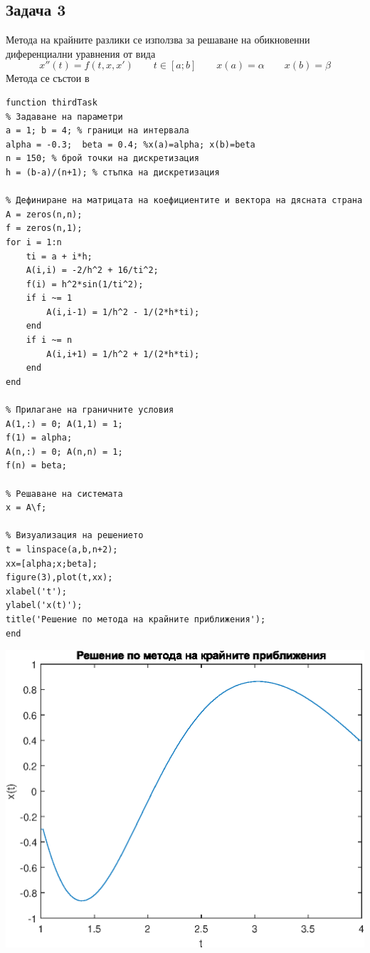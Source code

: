 \documentclass[a4paper,fleqn,12pt]{article}
\begin{document}
\newpage
\subsection{Задача 3}
Метода на крайните разлики се използва за решаване на обикновенни диференциални уравнения от вида 
\begin{equation*}
	x''(t)=f(t,x,x') \qquad t \in [a;b] \qquad x(a) = \alpha \qquad x(b) = \beta
\end{equation*}
Метода се състои в

\newpage
\begin{verbatim}
function thirdTask
% Задаване на параметри
a = 1; b = 4; % граници на интервала
alpha = -0.3;  beta = 0.4; %x(a)=alpha; x(b)=beta
n = 150; % брой точки на дискретизация
h = (b-a)/(n+1); % стъпка на дискретизация

% Дефиниране на матрицата на коефициентите и вектора на дясната страна
A = zeros(n,n);
f = zeros(n,1);
for i = 1:n
    ti = a + i*h;
    A(i,i) = -2/h^2 + 16/ti^2;
    f(i) = h^2*sin(1/ti^2);
    if i ~= 1
        A(i,i-1) = 1/h^2 - 1/(2*h*ti);
    end
    if i ~= n
        A(i,i+1) = 1/h^2 + 1/(2*h*ti);
    end
end

% Прилагане на граничните условия
A(1,:) = 0; A(1,1) = 1;
f(1) = alpha;
A(n,:) = 0; A(n,n) = 1;
f(n) = beta;

% Решаване на системата
x = A\f;

% Визуализация на решението
t = linspace(a,b,n+2);
xx=[alpha;x;beta];
figure(3),plot(t,xx);
xlabel('t');
ylabel('x(t)');
title('Решение по метода на крайните приближения');
end
\end{verbatim}

\includegraphics{thirdTask_01.eps}
\end{document}
